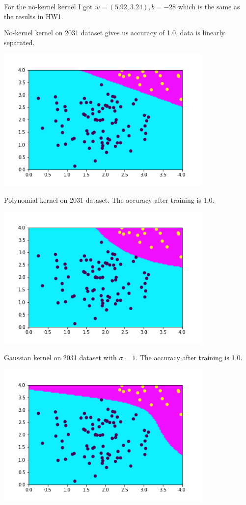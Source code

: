 \documentclass[newpage]{homework}
\begin{document}
\maketitle


\question
For the no-kernel kernel I got $w = (5.92, 3.24), b = -28$ which is the same as the results in HW1.

No-kernel kernel on 2031 dataset gives us accuracy of 1.0, data is linearly separated.
\begin{center}
    \includegraphics[width=0.8\textwidth]{1a.png}
\end{center}

Polynomial kernel on 2031 dataset. The accuracy after training is 1.0.
\begin{center}
    \includegraphics[width=0.8\textwidth]{1b.png}
\end{center}

Gaussian kernel on 2031 dataset with $\sigma=1$. The accuracy after training is 1.0.
\begin{center}
    \includegraphics[width=0.8\textwidth]{1c.png}
\end{center}
\end{document}

